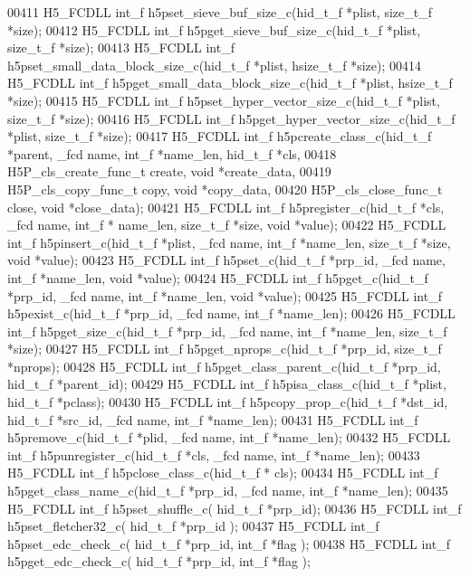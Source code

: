 \begin{DoxyCode}
00411 H5\_FCDLL int\_f h5pset\_sieve\_buf\_size\_c(hid\_t\_f *plist, size\_t\_f *size);
00412 H5\_FCDLL int\_f h5pget\_sieve\_buf\_size\_c(hid\_t\_f *plist, size\_t\_f *size);
00413 H5\_FCDLL int\_f h5pset\_small\_data\_block\_size\_c(hid\_t\_f *plist, hsize\_t\_f *size);
00414 H5\_FCDLL int\_f h5pget\_small\_data\_block\_size\_c(hid\_t\_f *plist, hsize\_t\_f *size);
00415 H5\_FCDLL int\_f h5pset\_hyper\_vector\_size\_c(hid\_t\_f *plist, size\_t\_f *size);
00416 H5\_FCDLL int\_f h5pget\_hyper\_vector\_size\_c(hid\_t\_f *plist, size\_t\_f *size);
00417 H5\_FCDLL int\_f h5pcreate\_class\_c(hid\_t\_f *parent, \_fcd name, int\_f *name\_len, hid\_t\_f *cls,
00418                   H5P\_cls\_create\_func\_t create, \textcolor{keywordtype}{void} *create\_data,
00419                   H5P\_cls\_copy\_func\_t copy, \textcolor{keywordtype}{void} *copy\_data,
00420                   H5P\_cls\_close\_func\_t close, \textcolor{keywordtype}{void} *close\_data);
00421 H5\_FCDLL int\_f h5pregister\_c(hid\_t\_f *cls, \_fcd name, int\_f * name\_len, size\_t\_f *size, \textcolor{keywordtype}{void} *value);
00422 H5\_FCDLL int\_f h5pinsert\_c(hid\_t\_f  *plist, \_fcd name, int\_f *name\_len, size\_t\_f *size, \textcolor{keywordtype}{void} *value);
00423 H5\_FCDLL int\_f h5pset\_c(hid\_t\_f *prp\_id, \_fcd name, int\_f *name\_len, \textcolor{keywordtype}{void} *value);
00424 H5\_FCDLL int\_f h5pget\_c(hid\_t\_f *prp\_id, \_fcd name, int\_f *name\_len, \textcolor{keywordtype}{void} *value);
00425 H5\_FCDLL int\_f h5pexist\_c(hid\_t\_f *prp\_id, \_fcd name, int\_f *name\_len);
00426 H5\_FCDLL int\_f h5pget\_size\_c(hid\_t\_f *prp\_id, \_fcd name, int\_f *name\_len, size\_t\_f *size);
00427 H5\_FCDLL int\_f h5pget\_nprops\_c(hid\_t\_f *prp\_id, size\_t\_f *nprops);
00428 H5\_FCDLL int\_f h5pget\_class\_parent\_c(hid\_t\_f *prp\_id, hid\_t\_f *parent\_id);
00429 H5\_FCDLL int\_f h5pisa\_class\_c(hid\_t\_f *plist, hid\_t\_f *pclass);
00430 H5\_FCDLL int\_f h5pcopy\_prop\_c(hid\_t\_f *dst\_id, hid\_t\_f *src\_id, \_fcd name, int\_f *name\_len);
00431 H5\_FCDLL int\_f h5premove\_c(hid\_t\_f *plid, \_fcd name, int\_f *name\_len);
00432 H5\_FCDLL int\_f h5punregister\_c(hid\_t\_f *cls, \_fcd name, int\_f *name\_len);
00433 H5\_FCDLL int\_f h5pclose\_class\_c(hid\_t\_f * cls);
00434 H5\_FCDLL int\_f h5pget\_class\_name\_c(hid\_t\_f *prp\_id, \_fcd name, int\_f *name\_len);
00435 H5\_FCDLL int\_f h5pset\_shuffle\_c( hid\_t\_f *prp\_id);
00436 H5\_FCDLL int\_f h5pset\_fletcher32\_c( hid\_t\_f *prp\_id );
00437 H5\_FCDLL int\_f h5pset\_edc\_check\_c( hid\_t\_f *prp\_id, int\_f *flag );
00438 H5\_FCDLL int\_f h5pget\_edc\_check\_c( hid\_t\_f *prp\_id, int\_f *flag );

\end{DoxyCode}

